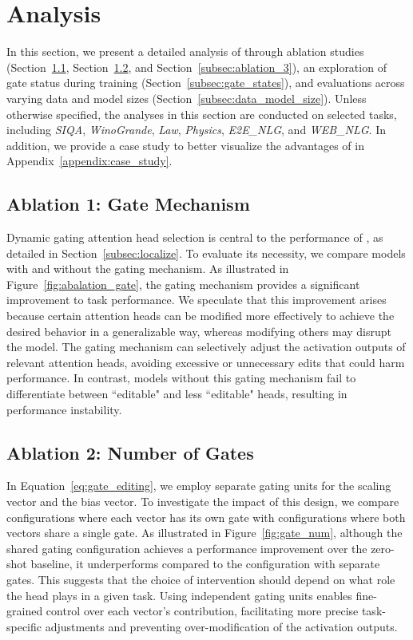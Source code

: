 \section{Analysis}
\label{sec:analysis}
In this section, we present a detailed analysis of \jola{} through ablation studies (Section~\ref{subsec:ablation_1}, Section~\ref{subsec:ablation_2}, and Section~\ref{subsec:ablation_3}), an exploration of gate status during training (Section~\ref{subsec:gate_states}), and evaluations across varying data and model sizes (Section~\ref{subsec:data_model_size}).
Unless otherwise specified, the analyses in this section are conducted on selected tasks, including \textit{SIQA}, \textit{WinoGrande}, \textit{Law}, \textit{Physics}, \textit{E2E\_NLG}, and \textit{WEB\_NLG}.
In addition, we provide a case study to better visualize the advantages of \jola{} in Appendix~\ref{appendix:case_study}.

\subsection{Ablation 1: Gate Mechanism}
\label{subsec:ablation_1}
Dynamic gating attention head selection is central to the performance of \jola{}, as detailed in Section~\ref{subsec:localize}.
To evaluate its necessity, we compare models with and without the gating mechanism.
As illustrated in Figure~\ref{fig:abalation_gate}, the gating mechanism provides a significant improvement to task performance.
We speculate that this improvement arises because certain attention heads can be modified more effectively to achieve the desired behavior in a generalizable way, whereas modifying others may disrupt the model. 
The gating mechanism can selectively adjust the activation outputs of relevant attention heads, avoiding excessive or unnecessary edits that could harm performance.
In contrast, models without this gating mechanism fail to differentiate between ``editable" and less ``editable" heads, resulting in performance instability.




\subsection{Ablation 2: Number of Gates}
\label{subsec:ablation_2}
In Equation~\ref{eq:gate_editing}, we employ separate gating units for the scaling vector and the bias vector.
To investigate the impact of this design, we compare configurations where each vector has its own gate with configurations where both vectors share a single gate.
As illustrated in Figure~\ref{fig:gate_num}, although the shared gating configuration achieves a performance improvement over the zero-shot baseline, it underperforms compared to the configuration with separate gates.
This suggests that the choice of intervention should depend on what role the head plays in a given task.
Using independent gating units enables fine-grained control over each vector’s contribution, facilitating more precise task-specific adjustments and preventing over-modification of the activation outputs.

